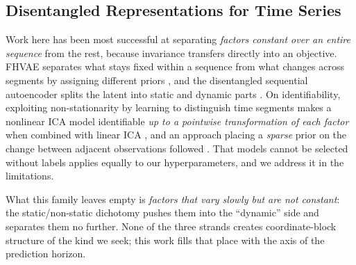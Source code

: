 \subsection{Disentangled Representations for Time Series}
\label{sec:disent}

Work here has been most successful at separating \emph{factors constant over
an entire sequence} from the rest, because invariance transfers directly into
an objective. FHVAE separates what stays fixed within a sequence from what
changes across segments by assigning different priors \cite{hsu2017}, and the
disentangled sequential autoencoder splits the latent into static and dynamic
parts \cite{li2018}. On identifiability, exploiting non-stationarity by
learning to distinguish time segments makes a nonlinear ICA model identifiable
\emph{up to a pointwise transformation of each factor} when combined with
linear ICA \cite{hyvarinen2016}, and an approach placing a \emph{sparse} prior
on the change between adjacent observations followed \cite{klindt2021}. That
models cannot be selected without labels \cite{locatello2019} applies equally
to our hyperparameters, and we address it in the limitations.

What this family leaves empty is \emph{factors that vary slowly but are not
constant}: the static/non-static dichotomy pushes them into the ``dynamic''
side and separates them no further. None of the three strands creates
coordinate-block structure of the kind we seek; this work fills that place with
the axis of the prediction horizon.

